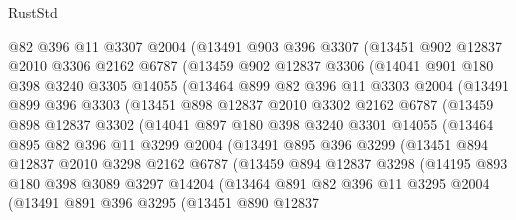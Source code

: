 \begin{lexlean}{RustStd}
\begin{coremodule}
    @82
    @396
    @11
    @3307
    @2004
    (@13491
      @903
      @396
      @3307
      (@13451
        @902
        @12837
        @2010
        @3306
        @2162
        @6787
        (@13459
          @902
          @12837
          @3306
          (@14041
            @901
            @180
            @398
            @3240
            @3305
            @14055
            (@13464
              @899
              @82
              @396
              @11
              @3303
              @2004
              (@13491
                @899
                @396
                @3303
                (@13451
                  @898
                  @12837
                  @2010
                  @3302
                  @2162
                  @6787
                  (@13459
                    @898
                    @12837
                    @3302
                    (@14041
                      @897
                      @180
                      @398
                      @3240
                      @3301
                      @14055
                      (@13464
                        @895
                        @82
                        @396
                        @11
                        @3299
                        @2004
                        (@13491
                          @895
                          @396
                          @3299
                          (@13451
                            @894
                            @12837
                            @2010
                            @3298
                            @2162
                            @6787
                            (@13459
                              @894
                              @12837
                              @3298
                              (@14195
                                @893
                                @180
                                @398
                                @3089
                                @3297
                                @14204
                                (@13464
                                  @891
                                  @82
                                  @396
                                  @11
                                  @3295
                                  @2004
                                  (@13491
                                    @891
                                    @396
                                    @3295
                                    (@13451
                                      @890
                                      @12837

\end{coremodule}
\end{lexlean}
